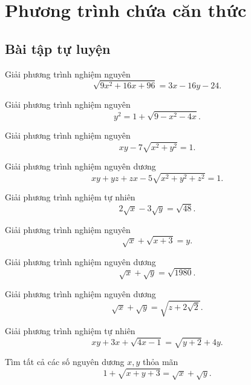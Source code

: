 \section{Phương trình chứa căn thức}

\subsection*{Bài tập tự luyện}
\begin{btt}
Giải phương trình nghiệm nguyên \[\sqrt{9x^2+16x+96}=3x-16y-24.\]
\end{btt}

\begin{btt}
Giải phương trình nghiệm nguyên \[y^2=1+\sqrt{9-x^2-4x}.\]
\end{btt}

\begin{btt}
Giải phương trình nghiệm nguyên $$xy-7\sqrt{x^2+y^2}=1.$$
\end{btt}

\begin{btt}
Giải phương trình nghiệm nguyên dương $$xy+yz+zx-5\sqrt{x^2+y^2+z^2}=1.$$
\end{btt}

\begin{btt}
Giải phương trình nghiệm tự nhiên $$2\sqrt{x}-3\sqrt{y}=\sqrt{48}.$$
\end{btt}

\begin{btt}
Giải phương trình nghiệm nguyên $$\sqrt{x}+\sqrt{x+3}=y.$$
\end{btt}
 
\begin{btt}
Giải phương trình nghiệm nguyên dương $$\sqrt{x}+\sqrt{y}=\sqrt{1980}.$$
\end{btt}

\begin{btt}
Giải phương trình nghiệm nguyên dương
$$\sqrt{x}+\sqrt{y}=\sqrt{z+2\sqrt{2}}.$$
\end{btt}

\begin{btt}
Giải phương trình nghiệm tự nhiên
\[xy+3x+\sqrt{4x-1}=\sqrt{y+2}+4y.\]
\end{btt}

\begin{btt}
Tìm tất cả các số nguyên dương $x,y$ thỏa mãn
\[1+\sqrt{x+y+3}=\sqrt{x}+\sqrt{y}.\]
\end{btt}

